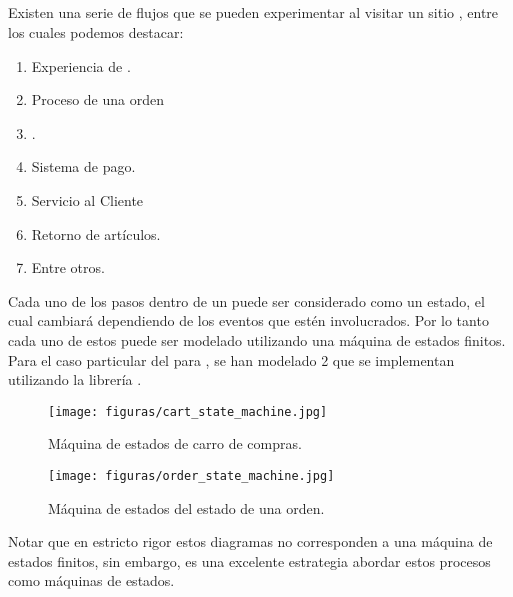 
\subsection{\workflowsCPT}


Existen una serie de flujos que se pueden experimentar al visitar un sitio \ecommerceCOM, entre los cuales podemos destacar:

	\begin{enumerate}
		\item
			Experiencia de \shoppingCOM.
		\item
			Proceso de una orden
		\item
			\shipping.
		\item
			Sistema de pago.
		\item
			Servicio al Cliente
		\item
			Retorno de artículos.
		\item
			Entre otros. 
	\end{enumerate}


Cada uno de los pasos dentro de un \workflowsCPT puede ser considerado como un estado, el cual cambiará dependiendo de los eventos que estén involucrados. Por lo tanto cada uno de estos \workflowsCPT puede ser modelado utilizando una máquina de estados finitos.
Para el caso particular del \frameworkPC para \ecommerceCOM, se han modelado 2 \workflowsCPT que se implementan utilizando la librería \javaScriptNAME \finiteStateMachine.

\begin{figure}[H]
	\centering
	\texttt{[image: figuras/cart\_state\_machine.jpg]}

	\caption{Máquina de estados de carro de compras.}
	\label{figure:cart_state_machine}
\end{figure}


\begin{figure}[H]
	\centering
	\texttt{[image: figuras/order\_state\_machine.jpg]}

	\caption{Máquina de estados del estado de una orden.}
	\label{figure:order_state_machine}
\end{figure}

Notar que en estricto rigor estos diagramas no corresponden a una máquina de estados finitos, sin embargo, es una excelente estrategia abordar estos procesos como máquinas de estados.